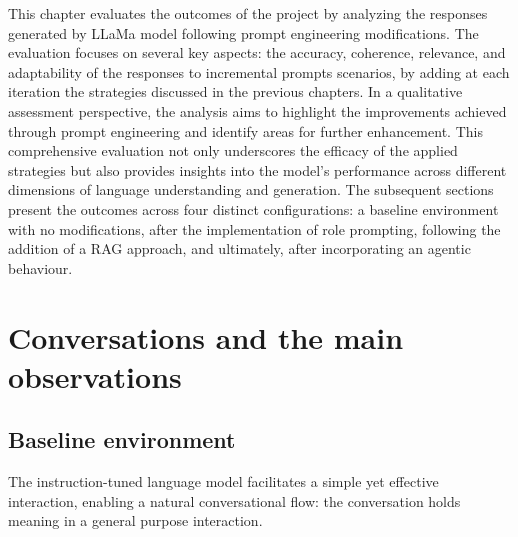 This chapter evaluates the outcomes of the project by analyzing the responses generated by LLaMa model following prompt engineering modifications. The evaluation focuses on several key aspects: the accuracy, coherence, relevance, and adaptability of the responses to incremental prompts scenarios, by adding at each iteration the strategies discussed in the previous chapters. In a qualitative assessment perspective, the analysis aims to highlight the improvements achieved through prompt engineering and identify areas for further enhancement. This comprehensive evaluation not only underscores the efficacy of the applied strategies but also provides insights into the model's performance across different dimensions of language understanding and generation. The subsequent sections present the outcomes across four distinct configurations: a baseline environment with no modifications, after the implementation of role prompting, following the addition of a RAG approach, and ultimately, after incorporating an agentic behaviour.




\section{Conversations and the main observations}
\label{sec:conversations}


\subsection{Baseline environment}
\label{sec:baseline}

The instruction-tuned language model facilitates a simple yet effective interaction, enabling a natural conversational flow: the conversation holds meaning in a general purpose interaction.

